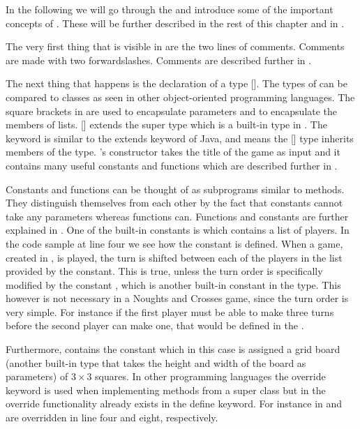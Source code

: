 In the following we will go through the 
and introduce some of the important concepts of \productname{}. These will be
further described in the rest of this chapter and in
.

The very first thing that is visible in  are the
two lines of comments. Comments are made with two forwardslashes. Comments are
described further in .

The next thing that happens is the declaration of a type 
[].  The types of \productname{} can be compared to classes as
seen in other object-oriented programming languages. The square brackets in
\productname{} are used to encapsulate parameters and to encapsulate the members
of lists.   [] extends the super type 
which is a built-in type in \productname{}. The  keyword is
similar to the extends keyword of Java, and means the [] type
inherits members of the  type.  's constructor takes the
title of the game as input and it contains many useful constants and
functions which are described further in . 

Constants and functions can be thought of as subprograms similar to methods.
They distinguish themselves from each other by the fact that constants cannot
take any parameters whereas functions can. Functions and constants are further
explained in . One of the built-in constants is
 which contains a list of players. In the code sample at line
four we see how the constant is defined. When a game, created in
\productname{}, is played, the turn is shifted between each of the players in
the list provided by the  constant. This is true, unless the turn
order is specifically modified by the constant , which is
another built-in constant in the  type. This however is not necessary
in a Noughts and Crosses game, since the turn order is very simple. For instance
if the first player must be able to make three turns before the second player
can make one, that would be defined in the .

Furthermore,  contains the constant  which in
this case is assigned a grid board (another built-in type that takes the height
and width of the board as parameters) of $3 \times 3$ squares. In other
programming languages the override keyword is used when implementing methods
from a super class but in \productname{} the override functionality
already exists in the define keyword. For instance in
  and  are
overridden in line four and eight, respectively.

